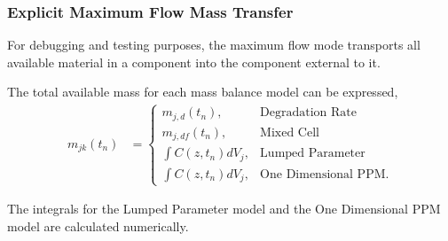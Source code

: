 \subsubsection{Explicit Maximum Flow Mass Transfer}\label{sed:max_flow_mass_transfer}

For debugging and testing purposes, the maximum flow mode transports all
available material in a component into the component external to it.

The total available mass for each mass balance model can be expressed,
\begin{align}
m_{jk}(t_n) &= \begin{cases}
                         m_{j,d}(t_n), & \mbox{Degradation Rate}\\
                         m_{j,df}(t_n), & \mbox{Mixed Cell}\\
                         \int C(z,t_n)dV_j, & \mbox{Lumped Parameter}\\
                         \int C(z,t_n)dV_j, & \mbox{One Dimensional PPM}.
               \end{cases}
\end{align}

The integrals for the Lumped Parameter model and the One Dimensional PPM model
are calculated numerically.
